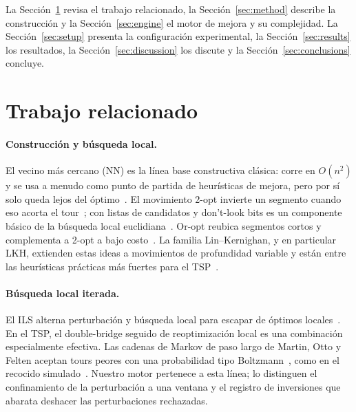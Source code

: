 \documentclass[runningheads]{llncs}
\begin{document}
La Sección~\ref{sec:related} revisa el trabajo relacionado, la
Sección~\ref{sec:method} describe la construcción y la
Sección~\ref{sec:engine} el motor de mejora y su complejidad. La
Sección~\ref{sec:setup} presenta la configuración experimental, la
Sección~\ref{sec:results} los resultados, la
Sección~\ref{sec:discussion} los discute y la
Sección~\ref{sec:conclusions} concluye.

\section{Trabajo relacionado}
\label{sec:related}

\paragraph{Construcción y búsqueda local.} El vecino más cercano (NN) es
la línea base constructiva clásica: corre en $O(n^2)$ y se usa a menudo
como punto de partida de heurísticas de mejora, pero por sí solo queda
lejos del óptimo~\cite{kizilatecs2013nearest}. El movimiento 2-opt
invierte un segmento cuando eso acorta el tour~\cite{croes1958method};
con listas de candidatos y don't-look bits es un componente básico de la
búsqueda local euclidiana~\cite{johnson1997tsp,bentley1992fast}. Or-opt
reubica segmentos cortos y complementa a 2-opt a bajo
costo~\cite{or1976traveling}. La familia Lin--Kernighan, y en particular
LKH, extienden estas ideas a movimientos de profundidad variable y están
entre las heurísticas prácticas más fuertes para el
TSP~\cite{lin1973effective,helsgaun2000effective,helsgaun2017extension}.

\paragraph{Búsqueda local iterada.} El ILS alterna perturbación y
búsqueda local para escapar de óptimos locales~\cite{lourencco2003ils}.
En el TSP, el double-bridge seguido de reoptimización local es una
combinación especialmente efectiva. Las cadenas de Markov de paso largo
de Martin, Otto y Felten aceptan tours peores con una probabilidad tipo
Boltzmann~\cite{martin1991large}, como en el recocido
simulado~\cite{kirkpatrick1983optimization}. Nuestro motor pertenece a
esta línea; lo distinguen el confinamiento de la perturbación a una
ventana y el registro de inversiones que abarata deshacer las
perturbaciones rechazadas.
\end{document}
